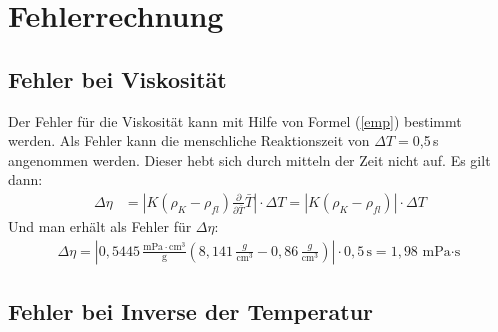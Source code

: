 \documentclass[fontsize=12pt]{scrartcl}
\renewcommand{\l}{\left\vert}
\renewcommand{\r}{\right\vert}
\begin{document}
\section{Fehlerrechnung}

\subsection{Fehler bei Viskosität}

Der Fehler für die Viskosität kann mit Hilfe von Formel (\ref{emp}) bestimmt werden. Als Fehler kann die menschliche Reaktionszeit von $\Delta T=$0,5\,s  angenommen werden. Dieser hebt sich durch mitteln der Zeit nicht auf. Es gilt dann:
\begin{align*}
\Delta\eta &= \l K(\rho_K-\rho_{fl}) \frac{\partial}{\partial \bar{T}}\bar{T}\r\cdot \Delta T= \l K(\rho_K-\rho_{fl})\r\cdot \Delta T
\end{align*}
Und man erhält als Fehler für $\Delta\eta$:
\begin{align*}
\Delta\eta  = \l0 ,5445\,\frac{\text{mPa}\cdot\text{cm}^3}{\text{g}}(8,141\,\frac{g}{\text{cm}^3}- 0,86\,\frac{g}{\text{cm}^3})\r \cdot 0,5\,\text{s} = 1,98\,\text{mPa$\cdot$s}
\end{align*}

\subsection{Fehler bei Inverse der Temperatur}
\end{document}
